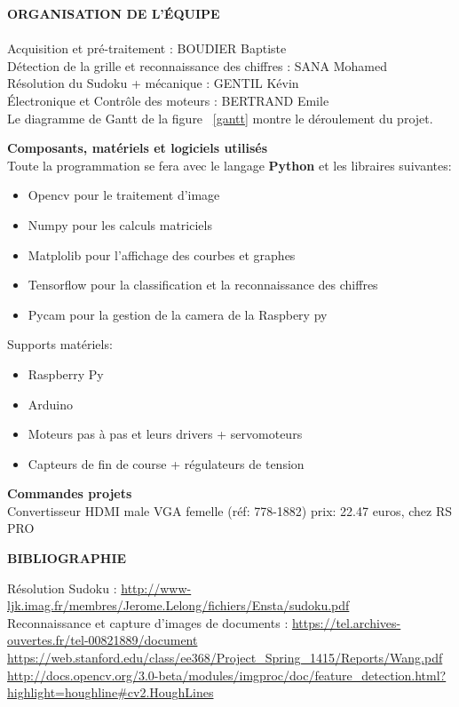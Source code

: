 \documentclass[11pt]{article}
\begin{document}
\item
\textbf{ORGANISATION DE L'ÉQUIPE}\\
\\
Acquisition et pré-traitement : BOUDIER Baptiste\\
Détection de la grille et reconnaissance des chiffres : SANA Mohamed\\
Résolution du Sudoku + mécanique : GENTIL Kévin\\
Électronique et Contrôle des moteurs : BERTRAND Emile\\
Le diagramme de Gantt de la figure ~\ref{gantt} montre le déroulement du projet.\\

\item
\textbf{Composants, matériels et logiciels utilisés}\\
Toute la programmation se fera avec le langage \textbf{Python} et les libraires suivantes:
\begin{itemize}
\item{Opencv} pour le traitement d'image
\item{Numpy} pour les calculs matriciels
\item{Matplolib} pour l'affichage des courbes et graphes
\item{Tensorflow} pour la classification et la reconnaissance des chiffres
\item{Pycam} pour la gestion de la camera de la Raspbery py
\end{itemize}
\item
Supports matériels:
\begin{itemize}
\item{Raspberry Py}
\item{Arduino}
\item{Moteurs pas à pas et leurs drivers + servomoteurs}
\item{Capteurs de fin de course + régulateurs de tension}
\end{itemize}
\newline
\item
\textbf{Commandes projets}\\
Convertisseur HDMI male VGA femelle (réf: 778-1882) prix: 22.47 euros, chez RS PRO\\
\newpage
\item
\textbf{BIBLIOGRAPHIE}\\
\item
Résolution Sudoku : \url{http://www-ljk.imag.fr/membres/Jerome.Lelong/fichiers/Ensta/sudoku.pdf}\\
Reconnaissance et capture d'images de documents :  \url{https://tel.archives-ouvertes.fr/tel-00821889/document}\\
\url{https://web.stanford.edu/class/ee368/Project_Spring_1415/Reports/Wang.pdf}\\
\url{http://docs.opencv.org/3.0-beta/modules/imgproc/doc/feature_detection.html?highlight=houghline#cv2.HoughLines}\\
\end{document}
